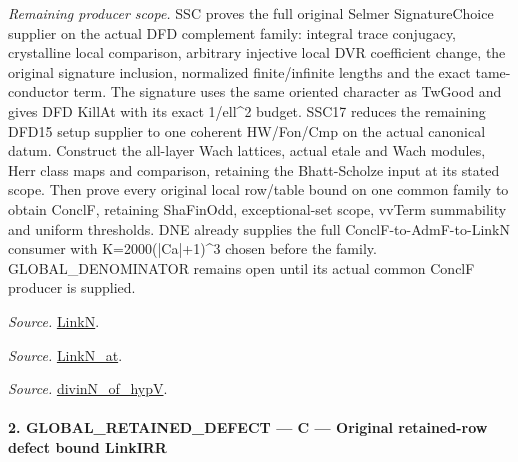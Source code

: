 \documentclass[11pt,a4paper]{article}
\numberwithin{equation}{section}
\theoremstyle{remark}\newtheorem{remark}[theorem]{Remark}
\begin{document}
\emph{Remaining producer scope.} SSC proves the full original Selmer SignatureChoice supplier on the actual DFD complement family: integral trace conjugacy, crystalline local comparison, arbitrary injective local DVR coefficient change, the original signature inclusion, normalized finite/infinite lengths and the exact tame-conductor term. The signature uses the same oriented character as TwGood and gives DFD KillAt with its exact 1/ell\textasciicircum{}2 budget. SSC17 reduces the remaining DFD15 setup supplier to one coherent HW/Fon/Cmp on the actual canonical datum. Construct the all-layer Wach lattices, actual etale and Wach modules, Herr class maps and comparison, retaining the Bhatt-Scholze input at its stated scope. Then prove every original local row/table bound on one common family to obtain ConclF, retaining ShaFinOdd, exceptional-set scope, vvTerm summability and uniform thresholds. DNE already supplies the full ConclF-to-AdmF-to-LinkN consumer with K=2000(|Ca|+1)\textasciicircum{}3 chosen before the family. GLOBAL\_\allowbreak DENOMINATOR remains open until its actual common ConclF producer is supplied.

\emph{Source.} \href{https://github.com/CocoSgt/riemann-hypothesis-lean/blob/7cbf7a0c32fca1badf05931879a37c3f8a2b03b4/src/Formalism/SharpRestriction/GlobalTheoremInputs.lean#L45-L48}{LinkN}.

\emph{Source.} \href{https://github.com/CocoSgt/riemann-hypothesis-lean/blob/7cbf7a0c32fca1badf05931879a37c3f8a2b03b4/src/Formalism/SharpRestriction/GlobalTheoremInputs.lean#L40-L44}{LinkN\_\allowbreak at}.

\emph{Source.} \href{https://github.com/CocoSgt/riemann-hypothesis-lean/blob/7cbf7a0c32fca1badf05931879a37c3f8a2b03b4/src/Development/AutomorphicArithmetic/CharacterBoxes/DivinNOfHypV.lean#L117-L134}{divinN\_\allowbreak of\_\allowbreak hypV}.



\paragraph{2. GLOBAL\_\allowbreak RETAINED\_\allowbreak DEFECT — C — Original retained-row defect bound LinkIRR}
\end{document}
